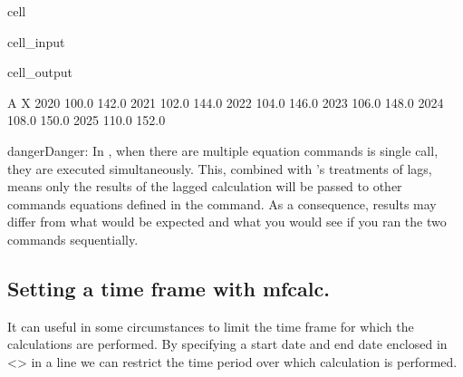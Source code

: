 \documentclass[letterpaper,10pt,english]{jupyterBook}
\begin{document}
\begin{sphinxuseclass}{cell}\begin{sphinxVerbatimInput}

\begin{sphinxuseclass}{cell_input}
\begin{sphinxVerbatim}[commandchars=\\\{\}]
  

  
\end{sphinxVerbatim}

\end{sphinxuseclass}\end{sphinxVerbatimInput}
\begin{sphinxVerbatimOutput}

\begin{sphinxuseclass}{cell_output}
\begin{sphinxVerbatim}[commandchars=\\\{\}]
          A      X
2020  100.0  142.0
2021  102.0  144.0
2022  104.0  146.0
2023  106.0  148.0
2024  108.0  150.0
2025  110.0  152.0
\end{sphinxVerbatim}

\end{sphinxuseclass}\end{sphinxVerbatimOutput}

\end{sphinxuseclass}
\begin{sphinxadmonition}{danger}{Danger:}
\sphinxAtStartPar
In , when there are multiple equation commands is single call, they are executed simultaneously. This, combined with ’s  treatments of lags, means only the results of the lagged calculation will be passed to other commands equations defined in the  command. As a consequence, results may differ from what would be expected and what you would see if you ran the two commands sequentially.
\end{sphinxadmonition}


\subsection{Setting a time frame with mfcalc.}
\label{\detokenize{content/04_PythonEssentials/ExtendingDataFrames:setting-a-time-frame-with-mfcalc}}
\sphinxAtStartPar
It can useful in some circumstances to limit the time frame for which the calculations are performed. By specifying a start date and end date enclosed in <> in a  line we can restrict the time period over which calculation is performed.
\end{document}
